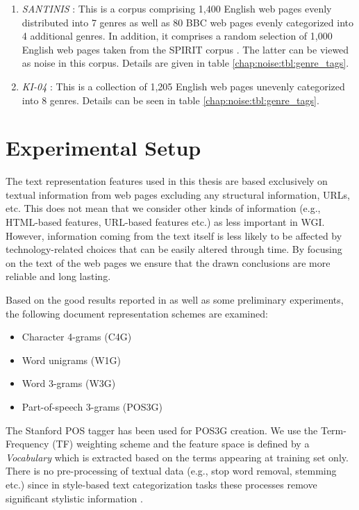\begin{enumerate}
	\item \textit{SANTINIS} \parencite{mehler2010genres_on_web}: This is a corpus comprising 1,400 English web pages evenly distributed into 7 genres as well as 80 BBC web pages evenly categorized into 4 additional genres. In addition, it comprises a random selection of 1,000 English web pages taken from the SPIRIT corpus \parencite{joho2004spirit}. The latter can be viewed as noise in this corpus. Details are given in table \ref{chap:noise:tbl:genre_tags}.
	\item \textit{KI-04} \parencite{meyer2004genre}: This is a collection of 1,205 English web pages unevenly categorized into 8 genres. Details can be seen in table \ref{chap:noise:tbl:genre_tags}.
\end{enumerate}


\section{Experimental Setup}\label{chap:noise:sec:experimental_setup}

The text representation features used in this thesis are based exclusively on textual information from web pages excluding any structural information, URLs, etc. This does not mean that we consider other kinds of information (e.g., HTML-based features, URL-based features etc.) as less important in WGI. However, information coming from the text itself is less likely to be affected by technology-related choices that can be easily altered through time. By focusing on the text of the web pages we ensure that the drawn conclusions are more reliable and long lasting.

Based on the good results reported in \parencite{sharoff2010web,kanaris2009learning,Asheghi2015} as well as some preliminary experiments, the following document representation schemes are examined: 

\begin{itemize}
    \item Character 4-grams (C4G)
    \item Word unigrams (W1G)
    \item Word 3-grams (W3G)
    \item Part-of-speech 3-grams (POS3G)
\end{itemize}

The Stanford POS tagger has been used for POS3G creation. We use the Term-Frequency (TF) weighting scheme and the feature space is defined by a \textit{Vocabulary} which is extracted based on the terms appearing at training set only. There is no pre-processing of textual data (e.g., stop word removal, stemming etc.) since in style-based text categorization tasks these processes remove significant stylistic information \parencite{stamatatos2009survey}.


